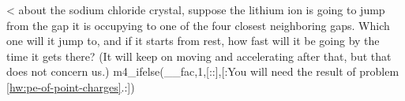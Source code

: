<%
about the sodium chloride crystal, suppose the lithium ion
is going to jump from the gap it is occupying to one of the
four closest neighboring gaps.  Which one will it jump to,
and if it starts from rest, how fast will it be going by the
time it gets there?  (It will keep on moving and accelerating
after that, but that does not concern us.) 
m4_ifelse(__fac,1,[::],[:You will need the result of problem \ref{hw:pe-of-point-charges}.:])\answercheck

